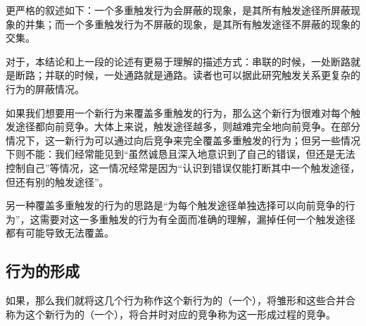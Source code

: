 \noindent{}
\begin{explain}
更严格的叙述如下：一个多重触发行为会屏蔽的现象，是其所有触发途径所屏蔽现象的并集；而一个多重触发行为不屏蔽的现象，是其所有触发途径不屏蔽的现象的交集。

对于\trained，本结论和上一段的论述有更易于理解的描述方式：串联的时候，一处断路就是断路；并联的时候，一处通路就是通路。读者也可以据此研究触发关系更复杂的行为的屏蔽情况。

如果我们想要用一个新行为来覆盖多重触发的行为，那么这个新行为很难对每个触发途径都向前竞争。大体上来说，触发途径越多，则越难完全地向前竞争。在部分情况下，这一新行为可以通过向后竞争来完全覆盖多重触发的行为；但另一些情况下则不能：我们经常能见到“虽然诚恳且深入地意识到了自己的错误，但还是无法控制自己”等情况，这一情况经常是因为“认识到错误仅能打断其中一个触发途径，但还有别的触发途径”。

另一种覆盖多重触发的行为的思路是“为每个触发途径单独选择可以向前竞争的行为”，这需要对这一多重触发的行为有全面而准确的理解，漏掉任何一个触发途径都有可能导致无法覆盖。
\insertparanotes
\end{explain}

\subsection{行为的形成}

如果，那么我们就将这几个行为称作这个新行为的（一个），将雏形和这些合并合称为这个新行为的（一个），将合并时对应的竞争称为这一形成过程的竞争。

